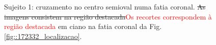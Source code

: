 \begin{figure}[H]
\centering
    \hfill
    \caption{Sujeito 1: cruzamento no centro semioval numa fatia coronal. \sout{As imagens consistem na região destacada}\textcolor{red}{Os recortes correspondem à região destacada} em ciano na fatia coronal da Fig. \ref{fig::172332_localizacao}.
    }
    \label{fig::172332_crossing}
\end{figure}


